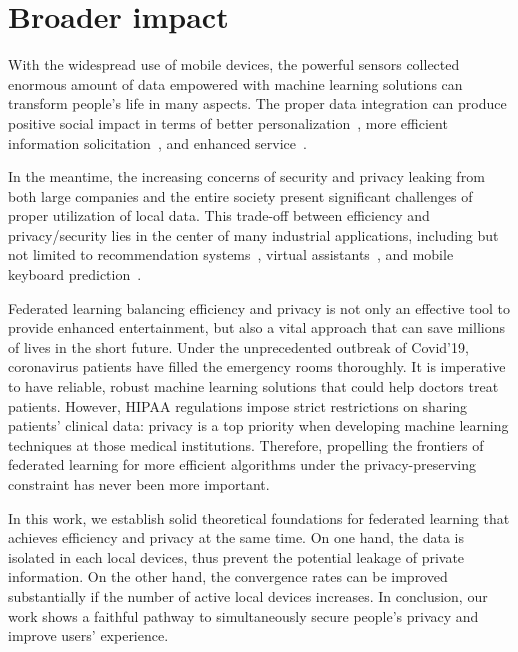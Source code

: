 
\section{Broader impact}
With the widespread use of mobile devices, the powerful sensors
collected enormous amount of data empowered with machine learning
solutions can transform people's life in many aspects. The proper
data integration can produce positive social
impact in terms of better personalization~\cite{fallah2020personalized}, more efficient information solicitation~\cite{chen2018federated}, and enhanced service~\cite{47586}.

In the meantime, the increasing concerns of security and
privacy leaking from both large companies and the entire society
present significant challenges of proper utilization of local
data. This trade-off between efficiency and privacy/security
lies in the center of many industrial applications, including 
but not limited to recommendation systems~\cite{chen2018federated}, virtual assistants~\cite{lamautonomy}, and mobile keyboard prediction~\cite{47586}.

Federated learning balancing efficiency and privacy is not only an effective
tool to provide enhanced entertainment, but also a vital approach that can
save millions of lives in the short future.  Under the unprecedented outbreak
of Covid'19, coronavirus patients have filled the emergency rooms
thoroughly. It is imperative to have reliable, robust machine learning
solutions that could help doctors treat patients. However,  HIPAA regulations
impose strict restrictions on sharing patients' clinical data: privacy is a
top priority when developing machine learning techniques at those medical institutions. 
Therefore, propelling the frontiers of federated learning for more efficient 
algorithms under the privacy-preserving constraint has never been more
important.

In this work, we establish solid theoretical foundations for federated
learning that achieves efficiency and privacy at the same time. 
On one hand, the data is isolated in each local devices, thus prevent
the potential leakage of private information. On the other hand, the
convergence rates can be improved substantially if the number of
active local devices increases. In conclusion, our work 
shows a faithful pathway to simultaneously secure people's privacy and improve
users' experience.



